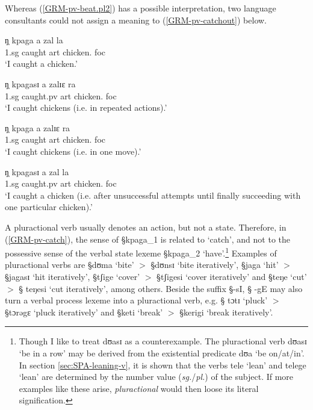 Whereas  (\ref{GRM-pv-beat.pl2})
has a possible interpretation, two language consultants
could not assign a meaning to (\ref{GRM-pv-catchout}) below. 




\begin{exe}
\ex\label{GRM-pv-catch}
  \begin{xlist}
    \ex\label{GRM-pv-catchsg}
\gll    ŋ̩  kpaga  a  zal  la  \\
         {\sc 1.sg}   {caught} {\sc art} {chicken.\sg} {\sc foc}\\
\glt `I caught a chicken.'


 \ex\label{GRM-pv-catchpl1}
\gll    ŋ̩    kpagasɪ  a  zalɪɛ ra  \\
       {\sc 1.sg} {caught.{\sc pv}} {\sc art} {chicken.\pl} {\sc foc}\\
\glt `I caught chickens (i.e. in repeated actions).'


 \ex\label{GRM-pv-catchpl2}
\gll   ŋ̩     kpaga  a  zalɪɛ ra   \\
       {\sc 1.sg}  {caught} {\sc art} {chicken.\pl} {\sc foc}\\
\glt `I caught chickens (i.e. in one move).'


 \ex\label{GRM-pv-catchout}
\gll *     ŋ̩  kpagasɪ  a  zal  la  \\
     {}   {\sc 1.sg}  {caught.{\sc pv}} {\sc art} {chicken.\sg} {\sc foc}\\
\glt `I caught a chicken (i.e. after unsuccessful attempts until finally
succeeding with
one particular chicken).'

 \end{xlist}
\end{exe}

A pluractional verb usually denotes an action, but not a state. Therefore, in
(\ref{GRM-pv-catch}), the sense of {\S kpaga}_{1} is related to `catch', and not
to the  possessive sense of the verbal state lexeme   {\S kpaga}_{2}
`have'.\footnote{Though I like to treat {\F dʊasɪ} as a counterexample.  The
pluractional verb {\F dʊasɪ} `be in a row'  may be  derived from the existential
predicate {\F dʊa} `be on/at/in'.  In section \ref{sec:SPA-leaning-v}, it is
shown that the verbs {\F tele} `lean'   and {\F telege} `lean' are determined by
the number value ({\it sg.}/{\it  pl.})  of the subject.  If more examples like
these  arise, {\it pluractional} would then loose its literal signification.}
Examples of pluractional verbs are {\S dʊma} `bite' $>$ {\S dʊnsɪ}  `bite
iteratively', {\S jaga} `hit' $>$ {\S jagasɪ} `hit iteratively', {\S tʃige}
`cover' $>$ {\S tʃigesi}  `cover iteratively' and {\S teŋe} `cut' $>$ {\S
teŋesi}  `cut iteratively',  among others.  Beside the suffix {\S -sI}, {\S
-gE} may also turn a verbal process lexeme into a pluractional verb, e.g.   {\S
tɔtɪ} `pluck' $>$ {\S  tɔrəgɛ} `pluck iteratively' and  {\S keti} `break'  $>$
{\S kerigi} `break iteratively'.



